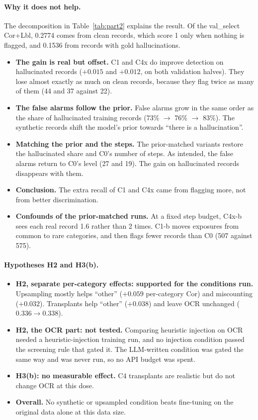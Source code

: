 \paragraph{Why it does not help.}
The decomposition in Table~\ref{tab:part2} explains the result. Of the val\_select Cor+Lbl, 0.2774 comes from clean records, which score 1 only when nothing is flagged, and 0.1536 from records with gold hallucinations.
\begin{itemize}
    \item \textbf{The gain is real but offset.} C1 and C4x do improve detection on hallucinated records ($+0.015$ and $+0.012$, on both validation halves). They lose almost exactly as much on clean records, because they flag twice as many of them (44 and 37 against 22).
    \item \textbf{The false alarms follow the prior.} False alarms grow in the same order as the share of hallucinated training records (73\% $\to$ 76\% $\to$ 83\%). The synthetic records shift the model's prior towards ``there is a hallucination''.
    \item \textbf{Matching the prior and the steps.} The prior-matched variants restore the hallucinated share and C0's number of steps. As intended, the false alarms return to C0's level (27 and 19). The gain on hallucinated records disappears with them.
    \item \textbf{Conclusion.} The extra recall of C1 and C4x came from flagging more, not from better discrimination.
    \item \textbf{Confounds of the prior-matched runs.} At a fixed step budget, C4x-b sees each real record 1.6 rather than 2 times. C1-b moves exposures from common to rare categories, and then flags fewer records than C0 (507 against 575).
\end{itemize}

\paragraph{Hypotheses H2 and H3(b).}
\begin{itemize}
    \item \textbf{H2, separate per-category effects: supported for the conditions run.} Upsampling mostly helps ``other'' ($+0.059$ per-category Cor) and miscounting ($+0.032$). Transplants help ``other'' ($+0.038$) and leave OCR unchanged ($0.336 \to 0.338$).
    \item \textbf{H2, the OCR part: not tested.} Comparing heuristic injection on OCR needed a heuristic-injection training run, and no injection condition passed the screening rule that gated it. The LLM-written condition was gated the same way and was never run, so no API budget was spent.
    \item \textbf{H3(b): no measurable effect.} C4 transplants are realistic but do not change OCR at this dose.
    \item \textbf{Overall.} No synthetic or upsampled condition beats fine-tuning on the original data alone at this data size.
\end{itemize}

